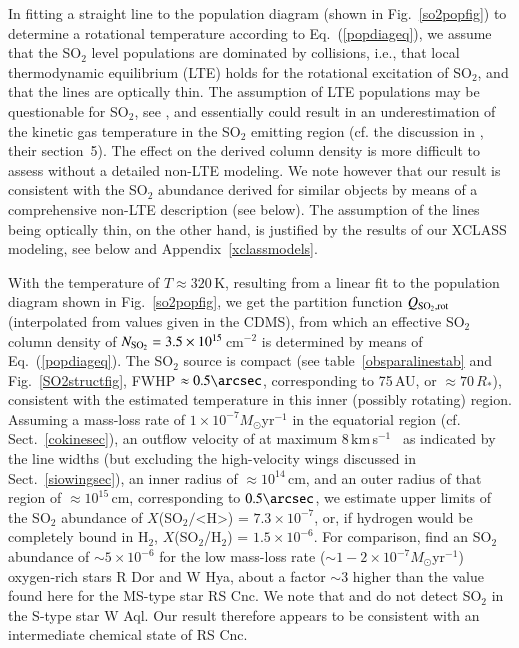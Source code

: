 \documentclass{aa}
\newcommand{\kms}{\,km\,s$^{-1}$~}
\begin{document}
In fitting a straight line to the population diagram (shown in
Fig.~\ref{so2popfig}) to determine a rotational temperature according
to Eq.~(\ref{popdiageq}), we assume that the SO$_2$ level populations
are dominated by collisions, i.e., that local thermodynamic equilibrium
(LTE) holds for the rotational excitation of SO$_2$, and that the
lines are optically thin. The assumption of LTE populations may be
questionable for SO$_2$, see \citet{ddbetal2016}, and essentially
could result in an underestimation of the kinetic gas temperature in
the SO$_2$ emitting region (cf. the discussion in \citet{gl99}, their
section~5).  The effect on the derived column density is more
difficult to assess without a detailed non-LTE modeling. We note
however that our result is consistent with the SO$_2$ abundance
derived for similar objects by means of a comprehensive non-LTE
description (see below). The assumption of the lines being optically
thin,  on the other hand, is justified by the results of our XCLASS
modeling, see below and Appendix~\ref{xclassmodels}.

With the temperature of $T\approx320\,$K, resulting from a linear fit
to the population diagram shown in Fig.~\ref{so2popfig}, we get the
partition function $Q_{\rm SO_2,rot}$ (interpolated from values given
in the CDMS), from which an effective SO$_2$ column density of $N_{\rm
  SO_2} = 3.5\times10^{15}$\,cm$^{-2}$ is determined  by means of
Eq.~(\ref{popdiageq}).  The SO$_2$ source is compact (see
table~\ref{obsparalinestab} and Fig.~\ref{SO2structfig}, FWHP
$\approx0.5\arcsec$, corresponding to 75\,AU, or $\approx 70\,R_*$),
consistent with the estimated temperature in this inner (possibly
rotating) region.  Assuming a mass-loss rate of $1 \times 10^{-7}
M_\odot$yr$^{-1}$ in the equatorial region
(cf. Sect.~\ref{cokinesec}), an outflow velocity of at maximum 8\kms
as indicated by the line widths (but excluding the high-velocity wings
discussed in Sect.~\ref{siowingsec}), an inner radius of $\approx
10^{14}$\,cm, and an outer radius of that region of $\approx
10^{15}$\,cm,  corresponding to $0.5\arcsec$, we estimate upper limits
of the SO$_2$ abundance of $X$(SO$_2/$<H>) = $7.3\times10^{-7}$, or,
if hydrogen would be completely bound in H$_2$, $X$(SO$_2$/H$_2$) =
$1.5\times10^{-6}$.  For comparison, \citet{ddbetal2016} find an
SO$_2$ abundance of $\sim 5\times10^{-6}$ for the low mass-loss rate
($\sim 1-2 \times 10^{-7} M_\odot$yr$^{-1}$) oxygen-rich stars R Dor
and W Hya, about a factor $\sim 3$ higher than the value found here
for the MS-type star RS Cnc. We note that 
\citet{2008A&A...480..431D} and \citet{do2020} do not detect SO$_2$ in
the S-type star W Aql. Our result therefore appears to be consistent
with an intermediate chemical state of RS Cnc.
 
\end{document}
